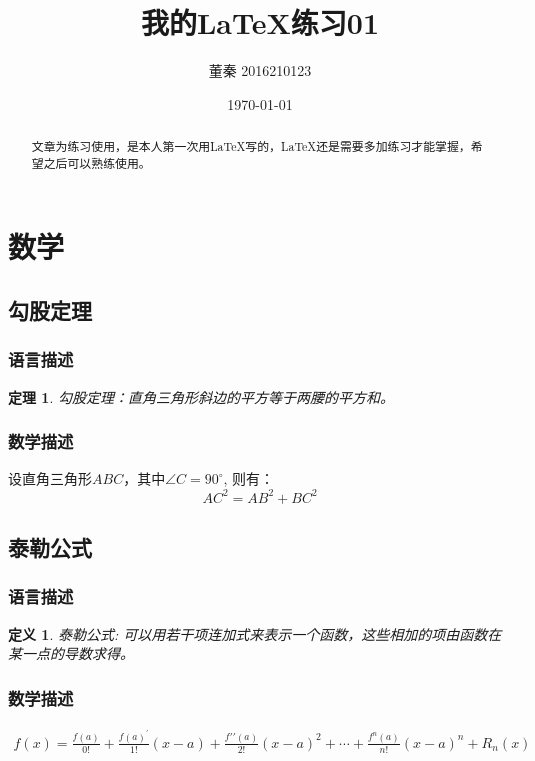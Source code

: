 \documentclass{article}
\title{\heiti 我的LaTeX练习01}
\author{\kaishu 董秦 2016210123}
\date{\today}
\newcommand\degree{^\circ} %
\newtheorem{theorem}{定理}[section]
\newtheorem{definition}{定义}[section]
\begin{document}
 
	\maketitle
	\begin{abstract}
		文章为练习使用，是本人第一次用LaTeX写的，LaTeX还是需要多加练习才能掌握，希望之后可以熟练使用。
	\end{abstract}
    \tableofcontents
    \newpage
    \section{数学}
    \subsection{勾股定理} %
    \subsubsection{语言描述}
    \begin{theorem}
    	{勾股定理}：直角三角形斜边的平方等于两腰的平方和。
    \end{theorem}
    \subsubsection{数学描述}
    设直角三角形$ABC$，其中$\angle C=90\degree$, 则有：
    \begin{equation} 
    AC^2 = AB^2 + BC^2
    \end{equation}
    
    \subsection{泰勒公式} %
    \subsubsection{语言描述}
    \begin{definition}
    	{泰勒公式}: 可以用若干项连加式来表示一个函数，这些相加的项由函数在某一点的导数求得。
    \end{definition}
    \subsubsection{数学描述}
    \begin{gather}
    f(x) = \frac{f(a)}{0!}+\frac{f(a)^\prime}{1!}(x-a)+\frac{f\prime\prime(a)}{2!}(x-a)^2+\cdots+\frac{f^n (a)}{n!}(x-a)^n+R_n(x)
    \end{gather}
    
\end{document}
